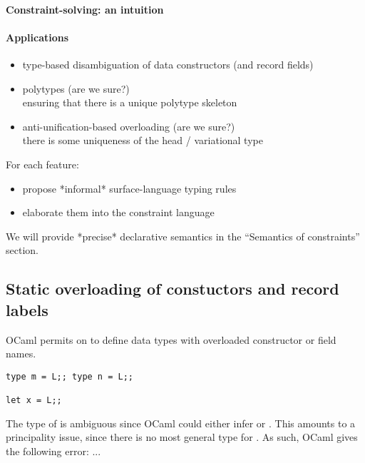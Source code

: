 \documentclass[acmsmall,screen,nonacm]{acmart}
\begin{document}
\paragraph{Constraint-solving: an intuition}


\paragraph{Applications}
\begin{itemize}
\item
  type-based disambiguation of data constructors (and record fields)
\item
  polytypes (are we sure?) \\ ensuring that there is a unique polytype
  skeleton
\item
  anti-unification-based overloading (are we sure?) \\ there is some
  uniqueness of the head / variational type
\end{itemize}


For each feature:
\begin{itemize}
\item propose *informal* surface-language typing rules
\item elaborate them into the constraint language
\end{itemize}

We will provide *precise* declarative semantics in the ``Semantics of
constraints'' section.

\subsection{Static overloading of constuctors and record labels}

OCaml permits on to define data types with overloaded constructor or field
names.
\begin{lstlisting}
type m = L;; type n = L;;

let x = L;;
\end{lstlisting}
The type of  is ambiguous since OCaml could either infer  or
. This amounts to a principality issue, since there is no most
general type for . As such, OCaml gives the following error: ...
\end{document}
